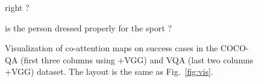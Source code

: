\documentclass{article}
\def \fsize {1pt}
\begin{document}
\begin{figure}[p]
\begin{minipage}{0.19\linewidth}
\begin{center}
{\textcolor[rgb]{0.5914,1.0000,0.3763}{right}
\textcolor[rgb]{0.5534,1.0000,0.4143}{?}
}	
\end{center}
\end{minipage}
\begin{minipage}{0.19\linewidth}
\begin{center}
\tiny{
\setlength{\fboxsep}{\fsize}
\textcolor[rgb]{0.0000,0.0000,0.5713}{is}
\textcolor[rgb]{0.0000,0.0000,0.5535}{the}
\textcolor[rgb]{0.0000,0.0000,0.5535}{person}
\textcolor[rgb]{0.0000,0.0000,0.5713}{dressed}
\textcolor[rgb]{0.0000,0.0000,0.7852}{properly}
\textcolor[rgb]{0.0000,0.0000,1.0000}{for}
\textcolor[rgb]{0.0000,0.0490,1.0000}{the}
\textcolor[rgb]{0.0980,1.0000,0.8697}{sport}
\textcolor[rgb]{0.9278,0.0153,0.0000}{?}
}	
\end{center}   
\end{minipage}
\caption{Visualization of co-attention maps on success cases in the COCO-QA (first three columns using +VGG) and VQA (last two columns +VGG) dataset. The layout is the same as Fig.~\ref{fig:vis}.}
\label{fig:vis2}
\end{figure}
\end{document}
